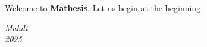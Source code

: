 Welcome to \textbf{Mathesis}. Let us begin at the beginning.

\vfill{}

\begin{flushright}
    \textit{Mahdi} \\
    \textit{2025} \\
\end{flushright}

\clearpage